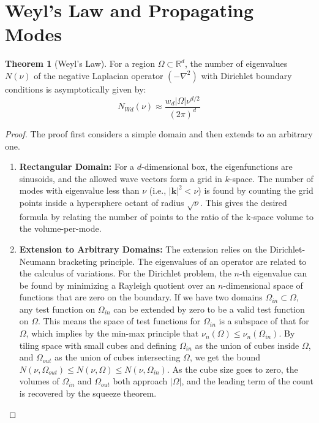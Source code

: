 \documentclass[12pt,a4paper]{article}
\theoremstyle{definition}
\newtheorem{theorem}{Theorem}[section]
\newcommand{\vect}[1]{\mathbf{#1}}
\newcommand{\R}{\mathbb{R}}
\newcommand{\laplacian}{\nabla^2}
\begin{document}
\section{Weyl's Law and Propagating Modes}
\label{sec:weyl}

\begin{theorem}[Weyl's Law]
\label{thm:weyl}
For a region $\Omega \subset \R^d$, the number of eigenvalues $N(\nu)$ of the negative Laplacian operator $(-\laplacian)$ with Dirichlet boundary conditions is asymptotically given by:
$$
N_{Wd}(\nu) \approx \frac{w_d |\Omega| \nu^{d/2}}{(2\pi)^d}
$$
\end{theorem}
\begin{proof}
The proof first considers a simple domain and then extends to an arbitrary one.
\begin{enumerate}
    \item \textbf{Rectangular Domain:} For a $d$-dimensional box, the eigenfunctions are sinusoids, and the allowed wave vectors form a grid in $k$-space. The number of modes with eigenvalue less than $\nu$ (i.e., $|\vect{k}|^2 < \nu$) is found by counting the grid points inside a hypersphere octant of radius $\sqrt{\nu}$. This gives the desired formula by relating the number of points to the ratio of the k-space volume to the volume-per-mode.
    
    \item \textbf{Extension to Arbitrary Domains:} The extension relies on the Dirichlet-Neumann bracketing principle. The eigenvalues of an operator are related to the calculus of variations. For the Dirichlet problem, the $n$-th eigenvalue can be found by minimizing a Rayleigh quotient over an $n$-dimensional space of functions that are zero on the boundary. If we have two domains $\Omega_{in} \subset \Omega$, any test function on $\Omega_{in}$ can be extended by zero to be a valid test function on $\Omega$. This means the space of test functions for $\Omega_{in}$ is a subspace of that for $\Omega$, which implies by the min-max principle that $\nu_n(\Omega) \le \nu_n(\Omega_{in})$. By tiling space with small cubes and defining $\Omega_{in}$ as the union of cubes inside $\Omega$, and $\Omega_{out}$ as the union of cubes intersecting $\Omega$, we get the bound $N(\nu, \Omega_{out}) \le N(\nu, \Omega) \le N(\nu, \Omega_{in})$. As the cube size goes to zero, the volumes of $\Omega_{in}$ and $\Omega_{out}$ both approach $|\Omega|$, and the leading term of the count is recovered by the squeeze theorem.
\end{enumerate}
\end{proof}
\end{document}

